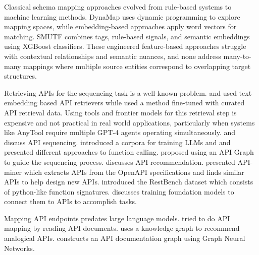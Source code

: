 \documentclass[sigconf, nonacm]{acmart}
\begin{document}
Classical schema mapping approaches evolved from rule-based systems to machine learning methods. DynaMap \cite{mazilu2022schema} uses dynamic programming to explore mapping spaces, while embedding-based approaches \cite{hättasch2022its} apply word vectors for matching. SMUTF \cite{zhang2025smutf} combines tags, rule-based signals, and semantic embeddings using XGBoost classifiers. These engineered feature-based approaches struggle with contextual relationships and semantic nuances, and none address many-to-many mappings where multiple source entities correspond to overlapping target structures.

Retrieving APIs for the sequencing task is a well-known problem. \cite{li2023api} and \cite{patil2023gorilla} used text embedding based API retrievers while \cite{toolllm} used a method fine-tuned with curated API retrieval data. Using tools and frontier models for this retrieval step is expensive and not practical in real world applications, particularly when systems like AnyTool require multiple GPT-4 agents operating simultaneously. \cite{saha2024sequential} and \cite{mandal2024graph} discuss API sequencing. \cite{basu-etal-2024-api} introduced a corpora for training LLMs and \cite{patil2023gorilla} and \cite{abdelaziz2024granitefunctioncallingmodelintroducing} presented different approaches to function calling. \cite{mandal2024graph} proposed using an API Graph to guide the sequencing process. \cite{chen2024apigen} discusses API recommendation. \cite{moon2024api} presented API-miner which extracts APIs from the OpenAPI specifications and finds similar APIs to help design new APIs. \cite{song2023restgpt} introduced the RestBench dataset which consists of python-like function signatures. \cite{liang2024taskmatrix} discusses training foundation models to connect them to APIs to accomplish tasks.

Mapping API endpoints predates large language models. \cite{lu2017learning} tried to do API mapping by reading API documents. \cite{liu2023recommeding} uses a knowledge graph to recommend analogical APIs. \cite{shao2022cross} constructs an API documentation graph using Graph Neural Networks. 
\end{document}
